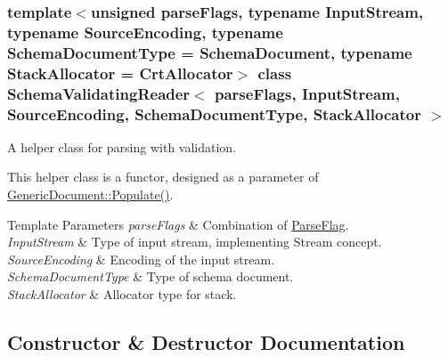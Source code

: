 \subsubsection*{template$<$unsigned parse\+Flags, typename Input\+Stream, typename Source\+Encoding, typename Schema\+Document\+Type = Schema\+Document, typename Stack\+Allocator = Crt\+Allocator$>$\newline
class Schema\+Validating\+Reader$<$ parse\+Flags, Input\+Stream, Source\+Encoding, Schema\+Document\+Type, Stack\+Allocator $>$}

A helper class for parsing with validation. 

This helper class is a functor, designed as a parameter of \hyperlink{class_generic_document_a36fbc7d0a9595d26e0d2c8859d207d1f}{Generic\+Document\+::\+Populate()}.


\begin{DoxyTemplParams}{Template Parameters}
{\em parse\+Flags} & Combination of \hyperlink{reader_8h_ab7be7dabe6ffcba60fad441505583450}{Parse\+Flag}. \\
\hline
{\em Input\+Stream} & Type of input stream, implementing Stream concept. \\
\hline
{\em Source\+Encoding} & Encoding of the input stream. \\
\hline
{\em Schema\+Document\+Type} & Type of schema document. \\
\hline
{\em Stack\+Allocator} & Allocator type for stack. \\
\hline
\end{DoxyTemplParams}


\subsection{Constructor \& Destructor Documentation}
\mbox{\label{class_schema_validating_reader_ae7945b71687ad3dd13b9c3d096892eac}} 
